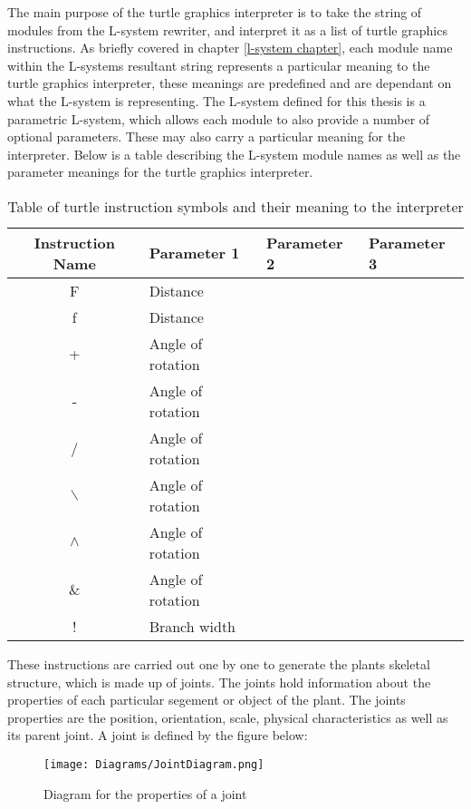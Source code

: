 The main purpose of the turtle graphics interpreter is to take the string of modules from the L-system rewriter, and interpret it as a list of turtle graphics instructions. As briefly covered in chapter \ref{l-system chapter}, each module name within the L-systems resultant string represents a particular meaning to the turtle graphics interpreter, these meanings are predefined and are dependant on what the L-system is representing. The L-system defined for this thesis is a parametric L-system, which allows each module to also provide a number of optional parameters. These may also carry a particular meaning for the interpreter. Below is a table describing the L-system module names as well as the parameter meanings for the turtle graphics interpreter.

\begin{table}[h!]
\centering
\begin{tabular}{ | c | l | l | l |}
\hline
	Instruction Name 	& Parameter 1 & Parameter 2 & Parameter 3 \\  
\hline
\hline
	F 							& Distance	&			&\\
\hline
	f 							& Distance	&			&\\
\hline
	+ 							& Angle of rotation 		&			&\\
\hline
	- 							& Angle	of rotation	&			&\\
\hline
	/ 							& Angle	of rotation	&			&\\
\hline
	$\backslash$ 				& Angle	of rotation	&			&\\
\hline
	$\land$ 					& Angle	of rotation	&			&\\
\hline
	\& 							& Angle	of rotation	&			&\\
\hline
	! 							& Branch width		&			&\\
\hline
\end{tabular}
\caption{Table of turtle instruction symbols and their meaning to the interpreter}
\label{instruction table 1}
\end{table}
\FloatBarrier

\noindent
These instructions are carried out one by one to generate the plants skeletal structure, which is made up of joints. The joints hold information about the properties of each particular segement or object of the plant. The joints properties are the position, orientation, scale, physical characteristics as well as its parent joint. A joint is defined by the figure below:

\begin{figure}[htbp]
	{\centering
		\vspace{7px}
		\texttt{[image: Diagrams/JointDiagram.png]}
		\caption{Diagram for the properties of a joint} \label{joint properties}
	}
\end{figure}
\FloatBarrier

